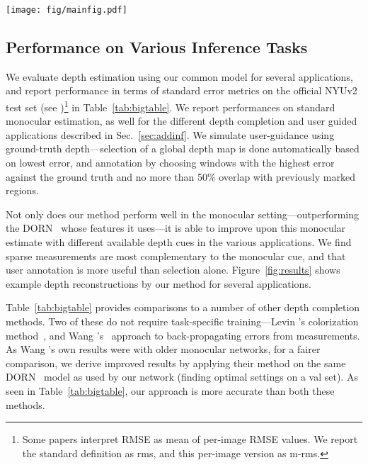 \documentclass[10pt,twocolumn,letterpaper]{article}
\begin{document}
\begin{figure*}[t]
  \centering
  \texttt{[image: fig/mainfig.pdf]}
  \caption{Example depth estimates for different applications. We show outputs from our method for both the pure monocular setting, as well as the improved estimates we obtain combining our distributional output with additional depth information---such as different kinds of partial measurements, and user guidance with annotation and selection.}
  \label{fig:results}
\end{figure*}

\subsection{Performance on Various Inference Tasks}

We evaluate depth estimation using our common model for several applications, and report performance in terms of standard error metrics on the official NYUv2 test set (see \cite{eigen2015predicting})\footnote{Some papers interpret RMSE as mean of per-image RMSE values. We report the standard definition as rms, and this per-image version as m-rms.} in Table~\ref{tab:bigtable}. We report performances on standard monocular estimation, as well for the different depth completion and user guided applications described in Sec.~\ref{sec:addinf}. We simulate user-guidance using ground-truth depth---selection of a global depth map is done automatically based on lowest error, and annotation by choosing  windows with the highest error against the ground truth and no more than 50\% overlap with previously marked regions.

Not only does our method perform well in the monocular setting---outperforming the DORN~\cite{fu2018deep} whose features it uses---it is able to improve upon this monocular estimate with different available depth cues in the various applications. We find sparse measurements are most complementary to the monocular cue, and that user annotation is more useful than selection alone. Figure~\ref{fig:results} shows example depth reconstructions by our method for several applications.

Table~\ref{tab:bigtable} provides comparisons to a number of other depth completion methods. Two of these do not require task-specific training---Levin \etal's colorization method~\cite{levin2004colorization}, and Wang \etal's~\cite{wang2019plug} approach to back-propagating errors from measurements. As Wang \etal's own results were with older monocular networks, for a fairer comparison, we derive improved results by applying their method on the same DORN~\cite{fu2018deep} model as used by our network (finding optimal settings on a val set). As seen in Table~\ref{tab:bigtable}, our approach is more accurate than both these methods.
\end{document}
